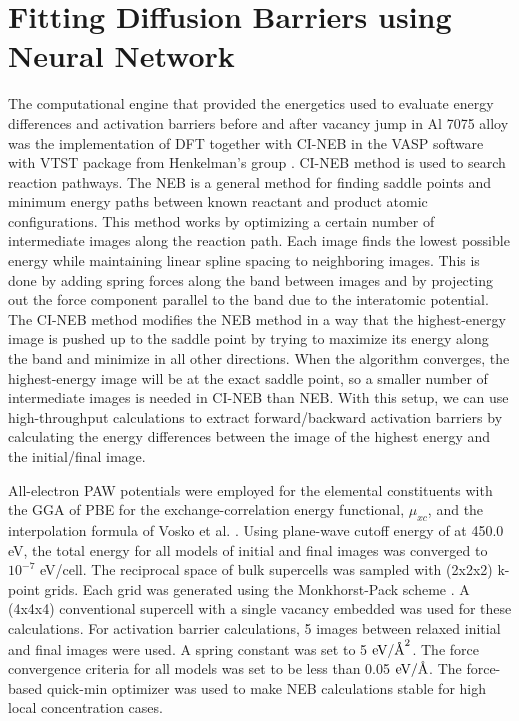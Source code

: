 \section{Fitting Diffusion Barriers using Neural Network}
\label{Chap:Al/Vac:section:NN}

The computational engine that provided the energetics used to evaluate energy differences and activation barriers before and after vacancy jump in Al 7075 alloy was the implementation of \ac{DFT} together with \acf{CI-NEB} in the \ac{VASP} software with VTST package from Henkelman's group \cite{henkelman2000climbing,henkelman2000improved}.
\ac{CI-NEB} method is used to search reaction pathways. The \acf{NEB} is a general method for finding saddle points and minimum energy paths between known reactant and product atomic configurations. This method works by optimizing a certain number of intermediate images along the reaction path. Each image finds the lowest possible energy while maintaining linear spline spacing to neighboring images. This is done by adding spring forces along the band between images and by projecting out the force component parallel to the band due to the interatomic potential. The \ac{CI-NEB} method modifies the \ac{NEB} method in a way that the highest-energy image is pushed up to the saddle point by trying to maximize its energy along the band and minimize in all other directions. When the algorithm converges, the highest-energy image will be at the exact saddle point, so a smaller number of intermediate images is needed in \ac{CI-NEB} than \ac{NEB}. With this setup, we can use high-throughput calculations to extract forward/backward activation barriers by calculating the energy differences between the image of the highest energy and the initial/final image.


All-electron \ac{PAW} potentials were employed for the elemental constituents with the \ac{GGA} of \ac{PBE} for the exchange-correlation energy functional, $\mu_{xc}$, and the interpolation formula of Vosko et al. \cite{vosko1980accurate}. Using plane-wave cutoff energy of at 450.0 eV, the total energy for all models of initial and final images was converged to $10^{−7}$ eV/cell. The reciprocal space of bulk supercells was sampled with (2x2x2) k-point grids. Each grid was generated using the Monkhorst-Pack scheme \cite{monkhorst1976special}. A (4x4x4) conventional supercell with a single vacancy embedded was used for these calculations. For activation barrier calculations, 5 images between relaxed initial and final images were used. A spring constant was set to 5 $\text{eV}/\mbox{\normalfont\AA}^2$. The force convergence criteria for all models was set to be less than 0.05 $\text{eV}/\mbox{\normalfont\AA}$. The force-based quick-min optimizer was used to make \ac{NEB} calculations stable for high local concentration cases. \cite{sheppard2008optimization}


